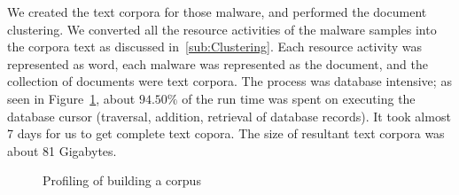 We created the text corpora for those {\gettotalmalwareiii{}} malware, and performed the document clustering.
We converted all the resource activities of the malware samples into the corpora text as discussed in~\autoref{sub:Clustering}.
Each resource activity was represented as word, each malware was represented as the document, and the collection of documents were text corpora.
The process was database intensive; as seen in Figure~\ref{fig:actcreation}, about $94.50\%$ of the run time was spent on executing the database cursor (traversal, addition, retrieval of database records).
It took almost 7 days for us to get complete text copora.
The size of resultant text corpora was about 81 Gigabytes.
\begin{figure}[ht]
    \centering
    \def\svgwidth{\columnwidth}
    \scalebox{1}{}
\caption{Profiling of building a corpus}
\label{fig:actcreation}
\end{figure}
\\
